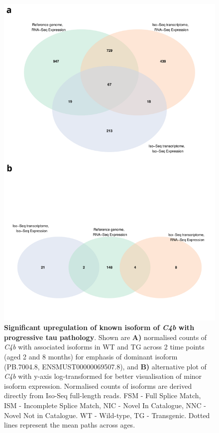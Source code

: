 \begin{figure}[!htp]
	\centering
	\includegraphics[page=12,scale = 0.55]{Figures/WholeDifferentialAnalysis.pdf}
	\captionsetup{width=0.95\textwidth}
	\caption[Differential Isoform Expression: Changes in transcript expression of isoforms associated with \textit{C4b}]%
	{\textbf{Significant upregulation of known isoform of \textit{C4b} with progressive tau pathology}. Shown are \textbf{A)} normalised counts of \textit{C4b} with associated isoforms in WT and TG across 2 time points (aged 2 and 8 months) for emphasis of dominant isoform (PB.7004.8, ENSMUST00000069507.8), and \textbf{B)} alternative plot of \textit{C4b} with y-axis log-transformed for better visualisation of minor isoform expression. Normalised counts of isoforms are derived directly from Iso-Seq full-length reads. FSM - Full Splice Match, ISM - Incomplete Splice Match, NIC - Novel In Catalogue, NNC - Novel Not in Catalogue. WT - Wild-type, TG - Transgenic. Dotted lines represent the mean paths across ages.}   
	\label{fig:DEI_c4b}
\end{figure}

